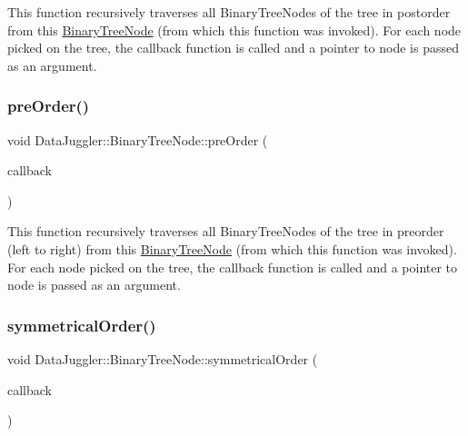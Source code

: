 This function recursively traverses all Binary\+Tree\+Nodes of the tree in postorder from this \hyperlink{classDataJuggler_1_1BinaryTreeNode}{Binary\+Tree\+Node} (from which this function was invoked). For each node picked on the tree, the callback function is called and a pointer to node is passed as an argument. \mbox{\label{classDataJuggler_1_1BinaryTreeNode_a39df9c1d2ae67bb35323548e83601bd4}} 
\subsubsection{\texorpdfstring{pre\+Order()}{preOrder()}}
{\footnotesize\ttfamily void Data\+Juggler\+::\+Binary\+Tree\+Node\+::pre\+Order (\begin{DoxyParamCaption}\item[{function$<$ void(\hyperlink{classDataJuggler_1_1BinaryTreeNode}{Binary\+Tree\+Node} $\ast$)$>$}]{callback }\end{DoxyParamCaption})}

This function recursively traverses all Binary\+Tree\+Nodes of the tree in preorder (left to right) from this \hyperlink{classDataJuggler_1_1BinaryTreeNode}{Binary\+Tree\+Node} (from which this function was invoked). For each node picked on the tree, the callback function is called and a pointer to node is passed as an argument. \mbox{\label{classDataJuggler_1_1BinaryTreeNode_a082f4223f8d7d40c5e85a9f2322a2b22}} 
\subsubsection{\texorpdfstring{symmetrical\+Order()}{symmetricalOrder()}}
{\footnotesize\ttfamily void Data\+Juggler\+::\+Binary\+Tree\+Node\+::symmetrical\+Order (\begin{DoxyParamCaption}\item[{function$<$ void(\hyperlink{classDataJuggler_1_1BinaryTreeNode}{Binary\+Tree\+Node} $\ast$)$>$}]{callback }\end{DoxyParamCaption})}

